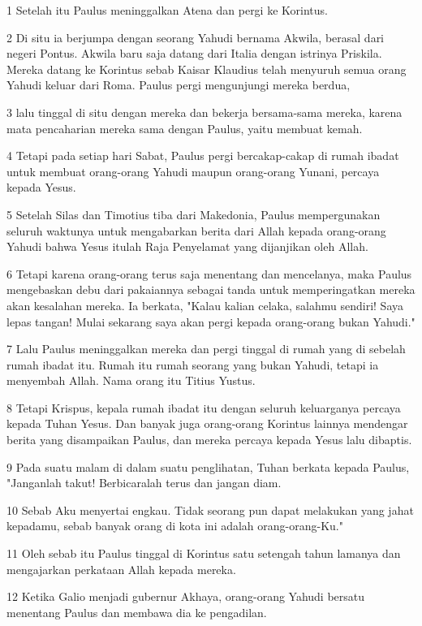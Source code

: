\par 1 Setelah itu Paulus meninggalkan Atena dan pergi ke Korintus.
\par 2 Di situ ia berjumpa dengan seorang Yahudi bernama Akwila, berasal dari negeri Pontus. Akwila baru saja datang dari Italia dengan istrinya Priskila. Mereka datang ke Korintus sebab Kaisar Klaudius telah menyuruh semua orang Yahudi keluar dari Roma. Paulus pergi mengunjungi mereka berdua,
\par 3 lalu tinggal di situ dengan mereka dan bekerja bersama-sama mereka, karena mata pencaharian mereka sama dengan Paulus, yaitu membuat kemah.
\par 4 Tetapi pada setiap hari Sabat, Paulus pergi bercakap-cakap di rumah ibadat untuk membuat orang-orang Yahudi maupun orang-orang Yunani, percaya kepada Yesus.
\par 5 Setelah Silas dan Timotius tiba dari Makedonia, Paulus mempergunakan seluruh waktunya untuk mengabarkan berita dari Allah kepada orang-orang Yahudi bahwa Yesus itulah Raja Penyelamat yang dijanjikan oleh Allah.
\par 6 Tetapi karena orang-orang terus saja menentang dan mencelanya, maka Paulus mengebaskan debu dari pakaiannya sebagai tanda untuk memperingatkan mereka akan kesalahan mereka. Ia berkata, "Kalau kalian celaka, salahmu sendiri! Saya lepas tangan! Mulai sekarang saya akan pergi kepada orang-orang bukan Yahudi."
\par 7 Lalu Paulus meninggalkan mereka dan pergi tinggal di rumah yang di sebelah rumah ibadat itu. Rumah itu rumah seorang yang bukan Yahudi, tetapi ia menyembah Allah. Nama orang itu Titius Yustus.
\par 8 Tetapi Krispus, kepala rumah ibadat itu dengan seluruh keluarganya percaya kepada Tuhan Yesus. Dan banyak juga orang-orang Korintus lainnya mendengar berita yang disampaikan Paulus, dan mereka percaya kepada Yesus lalu dibaptis.
\par 9 Pada suatu malam di dalam suatu penglihatan, Tuhan berkata kepada Paulus, "Janganlah takut! Berbicaralah terus dan jangan diam.
\par 10 Sebab Aku menyertai engkau. Tidak seorang pun dapat melakukan yang jahat kepadamu, sebab banyak orang di kota ini adalah orang-orang-Ku."
\par 11 Oleh sebab itu Paulus tinggal di Korintus satu setengah tahun lamanya dan mengajarkan perkataan Allah kepada mereka.
\par 12 Ketika Galio menjadi gubernur Akhaya, orang-orang Yahudi bersatu menentang Paulus dan membawa dia ke pengadilan.
